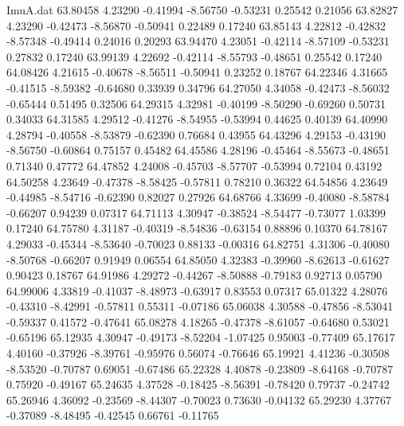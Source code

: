 \begin{filecontents}{ImuA.dat}
  63.80458    4.23290   -0.41994   -8.56750   -0.53231    0.25542    0.21056
  63.82827    4.23290   -0.42473   -8.56870   -0.50941    0.22489    0.17240
  63.85143    4.22812   -0.42832   -8.57348   -0.49414    0.24016    0.20293
  63.94470    4.23051   -0.42114   -8.57109   -0.53231    0.27832    0.17240
  63.99139    4.22692   -0.42114   -8.55793   -0.48651    0.25542    0.17240
  64.08426    4.21615   -0.40678   -8.56511   -0.50941    0.23252    0.18767
  64.22346    4.31665   -0.41515   -8.59382   -0.64680    0.33939    0.34796
  64.27050    4.34058   -0.42473   -8.56032   -0.65444    0.51495    0.32506
  64.29315    4.32981   -0.40199   -8.50290   -0.69260    0.50731    0.34033
  64.31585    4.29512   -0.41276   -8.54955   -0.53994    0.44625    0.40139
  64.40990    4.28794   -0.40558   -8.53879   -0.62390    0.76684    0.43955
  64.43296    4.29153   -0.43190   -8.56750   -0.60864    0.75157    0.45482
  64.45586    4.28196   -0.45464   -8.55673   -0.48651    0.71340    0.47772
  64.47852    4.24008   -0.45703   -8.57707   -0.53994    0.72104    0.43192
  64.50258    4.23649   -0.47378   -8.58425   -0.57811    0.78210    0.36322
  64.54856    4.23649   -0.44985   -8.54716   -0.62390    0.82027    0.27926
  64.68766    4.33699   -0.40080   -8.58784   -0.66207    0.94239    0.07317
  64.71113    4.30947   -0.38524   -8.54477   -0.73077    1.03399    0.17240
  64.75780    4.31187   -0.40319   -8.54836   -0.63154    0.88896    0.10370
  64.78167    4.29033   -0.45344   -8.53640   -0.70023    0.88133   -0.00316
  64.82751    4.31306   -0.40080   -8.50768   -0.66207    0.91949    0.06554
  64.85050    4.32383   -0.39960   -8.62613   -0.61627    0.90423    0.18767
  64.91986    4.29272   -0.44267   -8.50888   -0.79183    0.92713    0.05790
  64.99006    4.33819   -0.41037   -8.48973   -0.63917    0.83553    0.07317
  65.01322    4.28076   -0.43310   -8.42991   -0.57811    0.55311   -0.07186
  65.06038    4.30588   -0.47856   -8.53041   -0.59337    0.41572   -0.47641
  65.08278    4.18265   -0.47378   -8.61057   -0.64680    0.53021   -0.65196
  65.12935    4.30947   -0.49173   -8.52204   -1.07425    0.95003   -0.77409
  65.17617    4.40160   -0.37926   -8.39761   -0.95976    0.56074   -0.76646
  65.19921    4.41236   -0.30508   -8.53520   -0.70787    0.69051   -0.67486
  65.22328    4.40878   -0.23809   -8.64168   -0.70787    0.75920   -0.49167
  65.24635    4.37528   -0.18425   -8.56391   -0.78420    0.79737   -0.24742
  65.26946    4.36092   -0.23569   -8.44307   -0.70023    0.73630   -0.04132
  65.29230    4.37767   -0.37089   -8.48495   -0.42545    0.66761   -0.11765

\end{filecontents}
